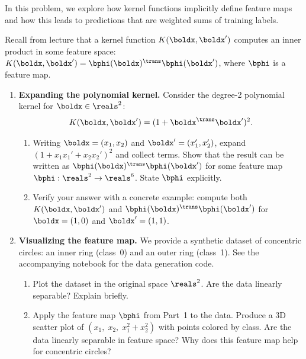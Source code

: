 \documentclass[submit]{harvardml}
\begin{document}
\begin{problem}

In this problem, we explore how kernel functions implicitly define
feature maps and how this leads to predictions that are weighted sums of
training labels.

Recall from lecture that a kernel function $K(\boldx, \boldx')$ computes
an inner product in some feature space: $K(\boldx, \boldx') =
\bphi(\boldx)^\trans \bphi(\boldx')$, where $\bphi$ is a feature map.

\begin{enumerate}

  \item[1.] \textbf{Expanding the polynomial kernel.}
  Consider the degree-2 polynomial kernel for $\boldx \in \reals^2$:
  \[
    K(\boldx, \boldx') = (1 + \boldx^\trans \boldx')^2.
  \]

  \begin{enumerate}
    \item Writing $\boldx = (x_1, x_2)$ and $\boldx' = (x_1', x_2')$,
    expand $(1 + x_1 x_1' + x_2 x_2')^2$ and collect terms. Show that the
    result can be written as $\bphi(\boldx)^\trans \bphi(\boldx')$ for
    some feature map $\bphi : \reals^2 \to \reals^6$. State $\bphi$
    explicitly.

    \item Verify your answer with a concrete example: compute both
    $K(\boldx, \boldx')$ and $\bphi(\boldx)^\trans \bphi(\boldx')$ for
    $\boldx = (1, 0)$ and $\boldx' = (1, 1)$.
  \end{enumerate}

  \item[2.] \textbf{Visualizing the feature map.}
  We provide a synthetic dataset of concentric circles: an inner ring
  (class~0) and an outer ring (class~1). See the accompanying notebook
  for the data generation code.

  \begin{enumerate}
    \item Plot the dataset in the original space $\reals^2$.
    Are the data linearly separable? Explain briefly.

    \item Apply the feature map $\bphi$ from Part~1 to the data. Produce
    a 3D scatter plot of $(x_1,\; x_2,\; x_1^2 + x_2^2)$ with points
    colored by class. Are the data linearly separable in feature space?
    Why does this feature map help for concentric circles?


\end{enumerate}
\end{enumerate}
\end{problem}
\end{document}
